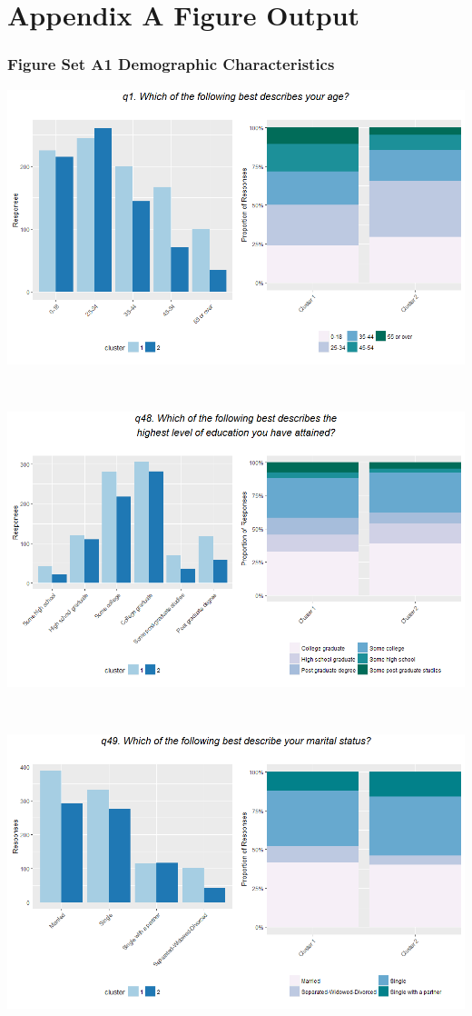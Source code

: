\documentclass[]{article}
\begin{document}
\newpage

\section{Appendix A Figure Output}\label{appendix-a-figure-output}

\subsubsection{Figure Set A1 Demographic
Characteristics}\label{figure-set-a1-demographic-characteristics}

\includegraphics[width=6.25000in]{images/barplot_q1.recat.png}

~

\includegraphics[width=6.25000in]{images/barplot_q48.png}

~

\includegraphics[width=6.25000in]{images/barplot_q49.png}
\end{document}
